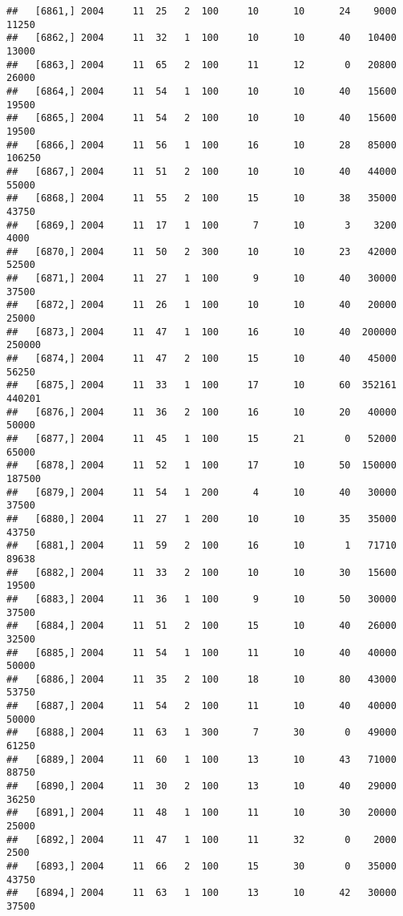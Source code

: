 \documentclass{article}\usepackage[]{graphicx}\usepackage[]{color}
\makeatletter
\newenvironment{kframe}{%
 \def\at@end@of@kframe{}%
 \ifinner\ifhmode%
  \def\at@end@of@kframe{\end{minipage}}%
  \begin{minipage}{\columnwidth}%
 \fi\fi%
 \def\FrameCommand##1{\hskip\@totalleftmargin \hskip-\fboxsep
 \colorbox{shadecolor}{##1}\hskip-\fboxsep
     \hskip-\linewidth \hskip-\@totalleftmargin \hskip\columnwidth}%
 \MakeFramed {\advance\hsize-\width
   \@totalleftmargin\z@ \linewidth\hsize
   \@setminipage}}%
 {\par\unskip\endMakeFramed%
 \at@end@of@kframe}
\newenvironment{knitrout}{}{} %
\makeatother
\begin{document}
\begin{knitrout}
\begin{kframe}
\begin{verbatim}
##   [6861,] 2004     11  25   2  100     10      10      24    9000   11250
##   [6862,] 2004     11  32   1  100     10      10      40   10400   13000
##   [6863,] 2004     11  65   2  100     11      12       0   20800   26000
##   [6864,] 2004     11  54   1  100     10      10      40   15600   19500
##   [6865,] 2004     11  54   2  100     10      10      40   15600   19500
##   [6866,] 2004     11  56   1  100     16      10      28   85000  106250
##   [6867,] 2004     11  51   2  100     10      10      40   44000   55000
##   [6868,] 2004     11  55   2  100     15      10      38   35000   43750
##   [6869,] 2004     11  17   1  100      7      10       3    3200    4000
##   [6870,] 2004     11  50   2  300     10      10      23   42000   52500
##   [6871,] 2004     11  27   1  100      9      10      40   30000   37500
##   [6872,] 2004     11  26   1  100     10      10      40   20000   25000
##   [6873,] 2004     11  47   1  100     16      10      40  200000  250000
##   [6874,] 2004     11  47   2  100     15      10      40   45000   56250
##   [6875,] 2004     11  33   1  100     17      10      60  352161  440201
##   [6876,] 2004     11  36   2  100     16      10      20   40000   50000
##   [6877,] 2004     11  45   1  100     15      21       0   52000   65000
##   [6878,] 2004     11  52   1  100     17      10      50  150000  187500
##   [6879,] 2004     11  54   1  200      4      10      40   30000   37500
##   [6880,] 2004     11  27   1  200     10      10      35   35000   43750
##   [6881,] 2004     11  59   2  100     16      10       1   71710   89638
##   [6882,] 2004     11  33   2  100     10      10      30   15600   19500
##   [6883,] 2004     11  36   1  100      9      10      50   30000   37500
##   [6884,] 2004     11  51   2  100     15      10      40   26000   32500
##   [6885,] 2004     11  54   1  100     11      10      40   40000   50000
##   [6886,] 2004     11  35   2  100     18      10      80   43000   53750
##   [6887,] 2004     11  54   2  100     11      10      40   40000   50000
##   [6888,] 2004     11  63   1  300      7      30       0   49000   61250
##   [6889,] 2004     11  60   1  100     13      10      43   71000   88750
##   [6890,] 2004     11  30   2  100     13      10      40   29000   36250
##   [6891,] 2004     11  48   1  100     11      10      30   20000   25000
##   [6892,] 2004     11  47   1  100     11      32       0    2000    2500
##   [6893,] 2004     11  66   2  100     15      30       0   35000   43750
##   [6894,] 2004     11  63   1  100     13      10      42   30000   37500

\end{verbatim}
\end{kframe}
\end{knitrout}
\end{document}
